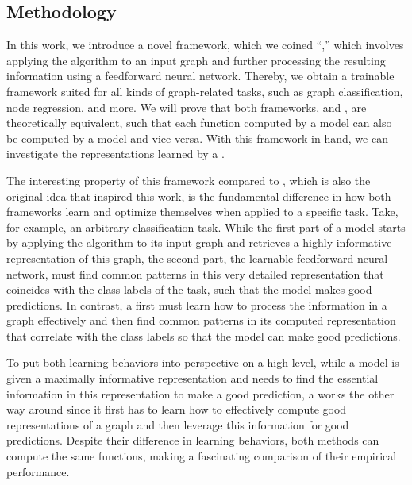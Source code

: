 
\subsection{Methodology}
In this work, we introduce a novel framework, which we coined ``\wlnn,'' which involves applying the \wl algorithm to an input graph and further processing the resulting information using a feedforward neural network. Thereby, we obtain a trainable framework suited for all kinds of graph-related tasks, such as graph classification, node regression, and more. We will prove that both frameworks, \wlnn and \gnn, are theoretically equivalent, such that each function computed by a \wlnn model can also be computed by a \gnn model and vice versa. With this framework in hand, we can investigate the representations learned by a \gnn.

The interesting property of this framework compared to \gnns, which is also the original idea that inspired this work, is the fundamental difference in how both frameworks learn and optimize themselves when applied to a specific task. Take, for example, an arbitrary classification task. While the first part of a \wlnn model starts by applying the \wl algorithm to its input graph and retrieves a highly informative representation of this graph, the second part, the learnable feedforward neural network, must find common patterns in this very detailed representation that coincides with the class labels of the task, such that the model makes good predictions. In contrast, a \gnn first must learn how to process the information in a graph effectively and then find common patterns in its computed representation that correlate with the class labels so that the model can make good predictions.

To put both learning behaviors into perspective on a high level, while a \wlnn model is given a maximally informative representation and needs to find the essential information in this representation to make a good prediction, a \gnn works the other way around since it first has to learn how to effectively compute good representations of a graph and then leverage this information for good predictions. Despite their difference in learning behaviors, both methods can compute the same functions, making a fascinating comparison of their empirical performance.

